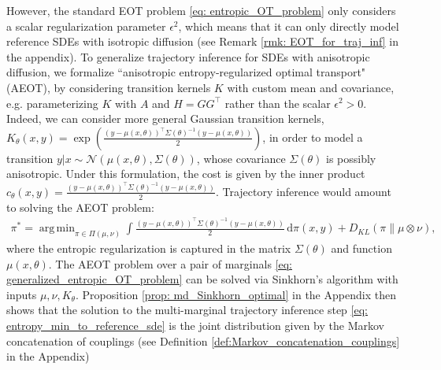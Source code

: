 \documentclass[twoside,11pt]{article}
\DeclareMathOperator*{\argmin}{arg\,min}
\begin{document}

However, the standard EOT problem \eqref{eq: entropic_OT_problem} only considers a scalar regularization parameter $\epsilon^2$, which means that it can only directly model reference SDEs with isotropic diffusion (see Remark \ref{rmk: EOT_for_traj_inf} in the appendix).
To generalize trajectory inference for SDEs with anisotropic diffusion, we formalize ``anisotropic entropy-regularized optimal transport" (AEOT), by considering transition kernels $K$ with custom mean and covariance, e.g. parameterizing $K$ with $A$ and $H=GG^\top$ rather than the scalar $\epsilon^2>0$. Indeed, we can consider more general Gaussian transition kernels, $K_{\theta}(x,y) = \exp({\frac{(y-\mu(x, \theta))^\top \Sigma(\theta)^{-1}(y-\mu(x, \theta))}{2}})$, in order to model a transition $y|x \sim \mathcal{N}(\mu(x, \theta), \Sigma(\theta))$, whose covariance $\Sigma(\theta)$ is possibly anisotropic. Under this formulation, the cost is given by the inner product $c_\theta(x,y) =\frac{(y-\mu(x, \theta))^\top \Sigma(\theta)^{-1}(y-\mu(x, \theta))}{2}$. Trajectory inference would amount to solving the AEOT problem:
\begin{align}
\pi^* = \argmin_{\pi \in \Pi(\mu,\nu)} \int \frac{(y-\mu(x, \theta))^\top \Sigma(\theta)^{-1}(y-\mu(x, \theta))}{2} \, \mathrm{d}\pi(x,y) + D_{KL}(\pi \| \mu \otimes \nu),
\label{eq: generalized_entropic_OT_problem}
\end{align}
where the entropic regularization is captured in the matrix $\Sigma(\theta)$ and function $\mu(x, \theta)$. The AEOT problem over a pair of marginals \eqref{eq: generalized_entropic_OT_problem} can be solved via Sinkhorn's algorithm with inputs $\mu, \nu, K_\theta$. Proposition \ref{prop: md_Sinkhorn_optimal} in the Appendix then shows that the solution to the multi-marginal trajectory inference step \eqref{eq: entropy_min_to_reference_sde} is the joint distribution given by the Markov concatenation of couplings (see Definition \ref{def:Markov_concatenation_couplings} in the Appendix)
\end{document}
